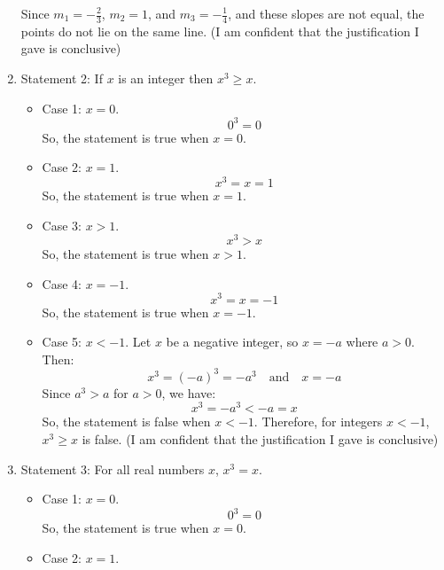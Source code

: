 \documentclass{article}
\begin{document}
\begin{enumerate}
          Since \(m_1 = -\frac{2}{3}\), \(m_2 = 1\), and \(m_3 = -\frac{1}{4}\), and these slopes are not equal, the points do not lie on the same line. (I am confident that the justification I gave is conclusive)
    \item Statement 2: If $x$ is an integer then $x^3 \geq x$.
          \begin{itemize}
              \item Case 1: $x = 0$.
                    \[
                        0^3 = 0
                    \]
                    So, the statement is true when $x=0$.
              \item Case 2: $x = 1$.
                    \[
                        x^3 = x = 1
                    \]
                    So, the statement is true when $x=1$.
              \item Case 3: $x > 1$.
                    \[
                        x^3 > x
                    \]
                    So, the statement is true when $x > 1$.
              \item Case 4: $x = -1$.
                    \[
                        x^3 = x = -1
                    \]
                    So, the statement is true when $x = -1$.
              \item Case 5: $x < -1$.\newline
                    Let \(x\) be a negative integer, so \(x = -a\) where \(a > 0\).
                    Then:
                    \[
                        x^3 = {(-a)}^3 = -a^3 \quad \text{and} \quad x = -a
                    \]
                    Since \(a^3 > a\) for \(a > 0\), we have:
                    \[
                        x^3 = -a^3 < -a = x
                    \]
                    So, the statement is false when $x < -1$.\newline
                    Therefore, for integers \(x < -1\), \(x^3 \geq x\) is false.\newline
                    (I am confident that the justification I gave is conclusive)
          \end{itemize}
    \item Statement 3: For all real numbers $x$, $x^3 = x$.
          \begin{itemize}
              \item Case 1: $x = 0$.
                    \[
                        0^3 = 0
                    \]
                    So, the statement is true when $x = 0$.
              \item Case 2: $x = 1$.

\end{itemize}
\end{enumerate}
\end{document}
